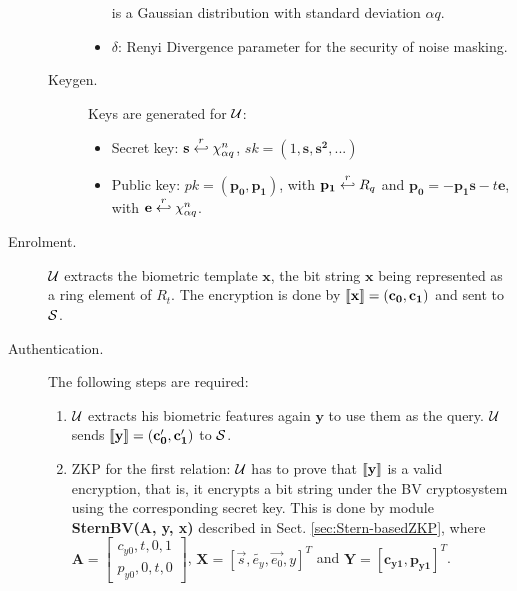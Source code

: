 \begin{description}
\begin{description}
\begin{itemize}
      is a Gaussian distribution with standard deviation $\alpha q$.
    \item \(\delta\): Renyi Divergence parameter for the security of noise masking.
    \end{itemize}
  \item[Keygen.] Keys are generated for $\mathcal{U}$:
    \begin{itemize}
    \item Secret key: $\mathbf{s} \stackrel{r}{\hookleftarrow} \chi_{\alpha q}^n$, \(sk = (1, \mathbf{s, s^{2}, ...})\)
    \item Public key: $pk = \mathbf{(p_0,p_1)}$, with $\mathbf{p_1} \stackrel{r}{\hookleftarrow} R_q$ and
      $\mathbf{p_0} = -\mathbf{p_1s} - t\mathbf{e}$, with $\mathbf{e} \stackrel{r}{\hookleftarrow} \chi_{\alpha q}^n$.
    \end{itemize}
  \end{description}
\item [Enrolment.] $\mathcal{U}$ extracts the biometric template $\mathbf{x}$, the bit string $\mathbf{x}$ being
  represented as a ring element of ${R}_t$.  The encryption is done by $\left\llbracket\mathbf{x}\right\rrbracket = (\mathbf{c_0},\mathbf{c_1})$
  and sent to $\mathcal{S}$.
\item [Authentication.] The following steps are required:
  \begin{enumerate}
  \item $\mathcal{U}$ extracts his biometric features again $\mathbf{y}$ to use them as the query. $\mathcal{U}$ sends
    $\left\llbracket\mathbf{y}\right\rrbracket = (\mathbf{c_0', c_1'})$ to $\mathcal{S}$.
  \item ZKP for the first relation: $\mathcal{U}$ has to prove that $\left\llbracket\mathbf{y}\right\rrbracket$ is a valid encryption, that is, it
    encrypts a bit string under the BV cryptosystem using the corresponding secret key. This is done by module
    \textbf{SternBV(A, y, x)} described in Sect. \ref{sec:Stern-basedZKP}, where
    $\mathbf{A} = \begin{bmatrix} c_{y0}, t, 0, 1\\p_{y0}, 0, t, 0
    \end{bmatrix}$, \(\mathbf{X} = [\vec{s},\tilde{e_{y}},\vec{e_{0}},y]^T\) and \(\mathbf{Y
    = [c_{y1},p_{y1}]}^{T}\).


\end{enumerate}
\end{description}
